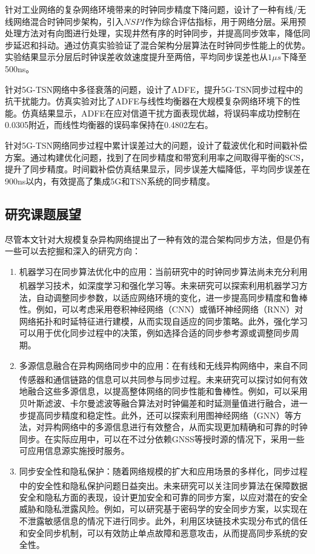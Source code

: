 \documentclass[UTF8,a4paper,12pt]{ctexart}
\numberwithin{equation}{section}
\begin{document}
	针对工业网络的复杂网络环境带来的时钟同步精度下降问题，设计了一种有线/无线网络混合时钟同步架构，引入$NSPI$作为综合评估指标，用于网络分层。采用预处理方法对有向图进行处理，实现井然有序的时钟同步，并提高同步效率，降低同步延迟和抖动。通过仿真实验验证了混合架构分层算法在时钟同步性能上的优势。实验结果显示分层后时钟误差收敛速度提升至两倍，平均同步误差也从$1\mu s$下降至500ns。
	
	针对5G-TSN网络中多径衰落的问题，设计了ADFE，提升5G-TSN同步过程中的抗干扰能力。仿真实验对比了ADFE与线性均衡器在大规模复杂网络环境下的性能。仿真结果显示，ADFE在应对信道干扰方面表现优越，将误码率成功控制在0.0305附近，而线性均衡器的误码率保持在0.4802左右。
	
	针对5G-TSN网络同步过程中累计误差过大的问题，设计了载波优化和时间戳补偿方案。通过构建优化问题，找到了在同步精度和带宽利用率之间取得平衡的SCS，提升了同步精度。时间戳补偿仿真结果显示，同步误差大幅降低，平均同步误差在900ns以内，有效提高了集成5G和TSN系统的同步精度。
	
	\subsection{研究课题展望}
	尽管本文针对大规模复杂异构网络提出了一种有效的混合架构同步方法，但是仍有一些可以去挖掘和深入的研究方向：
	
	\begin{enumerate}
		\item 机器学习在同步算法优化中的应用：当前研究中的时钟同步算法尚未充分利用机器学习技术，如深度学习和强化学习等\textsuperscript{\cite{jiqi}}。未来研究可以探索利用机器学习方法，自动调整同步参数，以适应网络环境的变化，进一步提高同步精度和鲁棒性。例如，可以考虑采用卷积神经网络（CNN）或循环神经网络（RNN）对网络拓扑和时延特征进行建模，从而实现自适应的同步策略。此外，强化学习可以用于优化同步过程中的决策，例如选择合适的同步参考源或调整同步周期。
		\item 多源信息融合在异构网络同步中的应用：在有线和无线异构网络中，来自不同传感器和通信链路的信息可以共同参与同步过程\textsuperscript{\cite{tang}}。未来研究可以探讨如何有效地融合这些多源信息，以提高整体网络的同步性能和鲁棒性。例如，可以采用贝叶斯滤波、卡尔曼滤波等融合算法对时钟偏差和时延测量值进行融合，进一步提高同步精度和稳定性。此外，还可以探索利用图神经网络（GNN）等方法，对异构网络中的多源信息进行有效整合，从而实现更加精确和可靠的时钟同步。在实际应用中，可以在不过分依赖GNSS等授时源的情况下，采用一些可应用信息源实施授时服务。
		
		\item 同步安全性和隐私保护：随着网络规模的扩大和应用场景的多样化，同步过程中的安全性和隐私保护问题日益突出\textsuperscript{\cite{yang}}。未来研究可以关注同步算法在保障数据安全和隐私方面的表现，设计更加安全和可靠的同步方案，以应对潜在的安全威胁和隐私泄露风险。例如，可以研究基于密码学的安全同步方案，以实现在不泄露敏感信息的情况下进行同步。此外，利用区块链技术实现分布式的信任和安全同步机制，可以有效防止单点故障和恶意攻击，从而提高同步系统的安全性。
	\end{enumerate}
	\newpage
	
	
	
\end{document}
